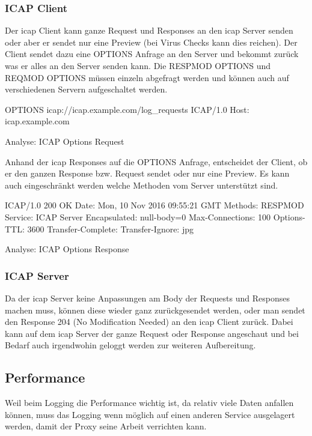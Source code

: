 \subsubsection{ICAP Client}
Der \gls{icap} Client kann ganze Request und Responses an den \gls{icap} Server senden oder aber er sendet nur eine Preview (bei Virus Checks kann dies reichen). Der Client sendet dazu eine OPTIONS Anfrage an den Server und bekommt zurück was er alles an den Server senden kann.
Die RESPMOD OPTIONS und REQMOD OPTIONS müssen einzeln abgefragt werden und können auch auf verschiedenen Servern aufgeschaltet werden.


\begin{listing}[H]
\begin{fancycode}
OPTIONS icap://icap.example.com/log_requests ICAP/1.0
Host: icap.example.com
\end{fancycode}
\caption{Analyse: ICAP Options Request}
\label{lst:icap-options-request}
\end{listing}

Anhand der \gls{icap} Responses auf die OPTIONS Anfrage, entscheidet der Client, ob er den ganzen Response bzw. Request sendet oder nur eine Preview.
Es kann auch eingeschränkt werden welche Methoden vom Server unterstützt sind.

\begin{listing}[H]
\begin{fancycode}
ICAP/1.0 200 OK
Date: Mon, 10 Nov 2016  09:55:21 GMT
Methods: RESPMOD
Service: ICAP Server
Encapsulated: null-body=0
Max-Connections: 100
Options-TTL: 3600
Transfer-Complete: 
Transfer-Ignore: jpg
\end{fancycode}
\caption{Analyse: ICAP Options Response}
\label{lst:icap-options-response}
\end{listing}


\subsubsection{ICAP Server}
Da der \gls{icap} Server keine Anpassungen am Body der Requests und Responses machen muss, können diese wieder ganz zurückgesendet werden, oder man sendet den Response 204 (No Modification Needed) an den \gls{icap} Client zurück.
Dabei kann auf dem \gls{icap} Server der ganze Request oder Response angeschaut und bei Bedarf auch irgendwohin geloggt werden zur weiteren Aufbereitung.



\subsection{Performance}
Weil beim Logging die Performance wichtig ist, da relativ viele Daten anfallen können, muss das Logging wenn möglich auf einen anderen Service ausgelagert werden, damit der Proxy seine Arbeit verrichten kann.


